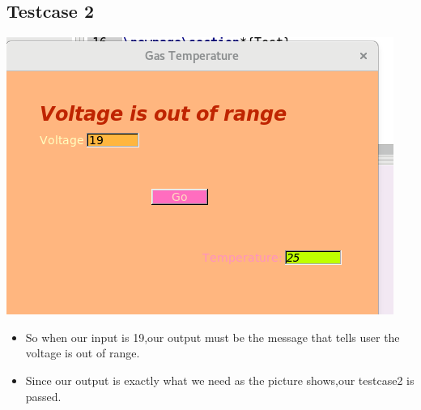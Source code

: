 \documentclass{article}
\begin{document}
\subsection*{Testcase 2}
\includegraphics{testcase2.png}
\begin{itemize}
	\item So when our input is 19,our output must be the message that tells user the voltage is out of range.
	\item Since our output is exactly what we need as the picture shows,our testcase2 is passed.
\end{itemize}
\end{document}
